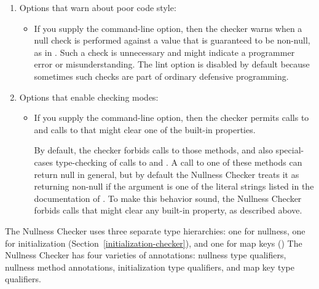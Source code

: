\begin{enumerate}
\item
  Options that warn about poor code style:

\begin{itemize}
\item
  \label{nullness-lint-nulltest}%
  If you supply the  command-line option, then the
  checker warns when a null check is performed against a value that is
  guaranteed to be non-null, as in .  Such a check is
  unnecessary and might indicate a programmer error or misunderstanding.
  The lint option is disabled by default because sometimes such checks are
  part of ordinary defensive programming.
\end{itemize}

\item
  Options that enable checking modes:

\begin{itemize}
\item
  If you supply the  command-line option,
  then the checker permits calls to
  and calls to
  that might clear one of the built-in properties.

  By default, the checker forbids calls to those methods, and also
  special-cases type-checking of calls to
  and
  .
  A call to one of these methods
  can return null in general, but by default the Nullness Checker treats it
  as returning non-null if the argument is one of the literal strings
  listed in the documentation of
  .
  To make this behavior sound, the Nullness Checker forbids calls that
  might clear any built-in property, as described above.
\end{itemize}

\end{enumerate}



The Nullness Checker uses three separate type hierarchies:  one for nullness,
one for initialization (Section~\ref{initialization-checker}),
and one for map keys ()
The Nullness Checker has four varieties of annotations:  nullness
type qualifiers, nullness method annotations, initialization type qualifiers, and
map key type
qualifiers.

